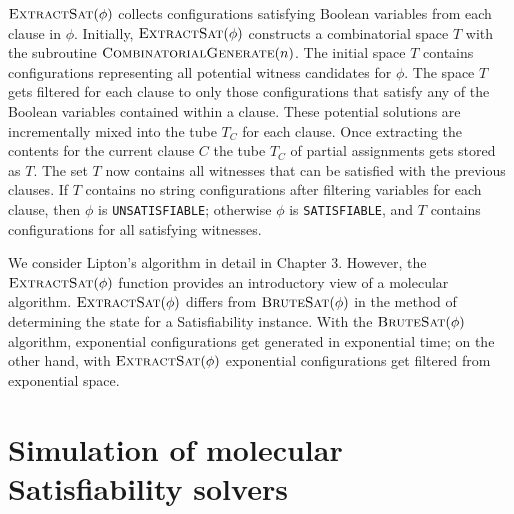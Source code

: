 $\text{\sc ExtractSat}(\phi)$ collects configurations satisfying Boolean variables from each clause in $\phi$.  Initially, $\text{\sc ExtractSat}(\phi)$ constructs a combinatorial space $T$ with the subroutine $\text{\sc CombinatorialGenerate}(n)$.  The initial space $T$ contains configurations representing all potential witness candidates for $\phi$.  The space $T$ gets filtered for each clause to only those configurations that satisfy any of the Boolean variables contained within a clause.  These potential solutions are incrementally mixed into the tube $T_C$ for each clause.  Once extracting the contents for the current clause $C$ the tube $T_C$ of partial assignments gets stored as $T$.  The set $T$ now contains all witnesses that can be satisfied with the previous clauses.  If $T$ contains no string configurations after filtering variables for each clause, then $\phi$ is \texttt{UNSATISFIABLE}; otherwise $\phi$ is \texttt{SATISFIABLE}, and $T$ contains configurations for all satisfying witnesses.

We consider Lipton's algorithm in detail in Chapter 3.  However, the $\text{\sc ExtractSat}(\phi)$ function provides an introductory view of a molecular algorithm.  $\text{\sc ExtractSat}(\phi)$ differs from $\text{\sc BruteSat}(\phi)$ in the method of determining the state for a {\sc Satisfiability} instance.  With the $\text{\sc BruteSat}(\phi)$ algorithm, exponential configurations get generated in exponential time; on the other hand, with $\text{\sc ExtractSat}(\phi)$ exponential configurations get filtered from exponential space.  

				
\section{Simulation of molecular {\sc Satisfiability} solvers}
	

